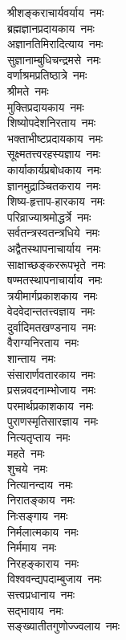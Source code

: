 \begin{multicols}{2}
    \begin{flushleft}
श्रीशङ्कराचार्यवर्याय~नमः\\
ब्रह्मज्ञानप्रदायकाय~नमः\\
अज्ञानतिमिरादित्याय~नमः\\
सुज्ञानाम्बुधिचन्द्रमसे~नमः\\
वर्णाश्रमप्रतिष्ठात्रे~नमः\\
श्रीमते~नमः\\
मुक्तिप्रदायकाय~नमः\\
शिष्योपदेशनिरताय~नमः\\
भक्ताभीष्टप्रदायकाय~नमः\\
सूक्ष्मतत्त्व\-रहस्यज्ञाय~नमः\\
                                        
कार्याकार्यप्रबोधकाय~नमः\\
ज्ञानमुद्राञ्चितकराय~नमः\\
शिष्य-हृत्ताप-हारकाय~नमः\\
परिव्राज्याश्रमोद्धर्त्रे~नमः\\
सर्वतन्त्रस्वतन्त्रधिये~नमः\\
अद्वैतस्थापनाचार्याय~नमः\\
साक्षाच्छङ्कररूपभृते~नमः\\
षण्मतस्थापनाचार्याय~नमः\\
त्रयीमार्गप्रकाशकाय~नमः\\
वेदवेदान्ततत्त्वज्ञाय~नमः\hfill{}\\
                                        
दुर्वादिमतखण्डनाय~नमः\\
वैराग्यनिरताय~नमः\\
शान्ताय~नमः\\
संसारार्णवतारकाय~नमः\\
प्रसन्नवदनाम्भोजाय~नमः\\
परमार्थप्रकाशकाय~नमः\\
पुराणस्मृतिसारज्ञाय~नमः\\
नित्यतृप्ताय~नमः\\
महते~नमः\\
शुचये~नमः\hfill{}\\
                                        
नित्यानन्दाय~नमः\\
निरातङ्काय~नमः\\
निःसङ्गाय~नमः\\
निर्मलात्मकाय~नमः\\
निर्ममाय~नमः\\
निरहङ्काराय~नमः\\
विश्ववन्द्यपदाम्बुजाय~नमः\\
सत्त्वप्रधानाय~नमः\\
सद्भावाय~नमः\\
सङ्ख्यातीत\-गुणोज्ज्वलाय~नमः\hfill{}\\
                                        

\end{flushleft}
\end{multicols}
